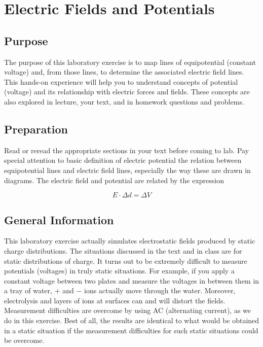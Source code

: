 
\chapter{Electric Fields and Potentials}

\begin{multicols}{2}
\section{Purpose}
The purpose of this laboratory exercise is to map lines of equipotential (constant voltage) and, from those lines, to determine the associated electric field lines. This hands-on experience will help you to understand concepts of potential (voltage) and its relationship with electric forces and fields.  These concepts are also explored in lecture, your text, and in homework questions and problems.
\section{Preparation}
Read or reread the appropriate sections in your text before coming to lab. Pay special attention to basic definition of electric potential the relation between equipotential lines and electric field lines, especially the way these are drawn in diagrams. The electric field and potential are related by the expression

\begin{equation} \label{e:EandV} E\cdot \Delta d = \Delta V \end{equation}


\section{General Information}

This laboratory exercise actually simulates electrostatic fields produced by static charge distributions.  The situations discussed in the text and in class are for static distributions of charge.  It turns out to be extremely difficult to measure potentials (voltages) in truly static situations.  For example, if you apply a constant voltage between two plates and measure the voltages in between them in a tray of water, $+$ and $-$ ions actually move through the water.  Moreover, electrolysis and layers of ions at surfaces can and will distort the fields.  Measurement difficulties are overcome by using AC (alternating current), as we do in this exercise.  Best of all, the results are identical to what would be obtained in a static situation if the measurement difficulties for such static situations could be overcome.


\end{multicols}

